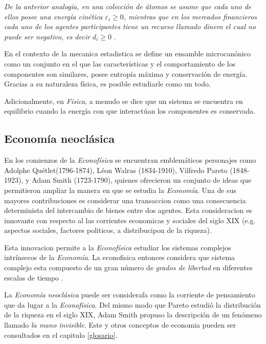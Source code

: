 \textit{De la anterior analogía, en una colección de átomos se asume que cada uno de ellos posee una energía cinética $\mathit{\varepsilon}_{i} \geqslant 0 $, mientras que en los mercados financieros cada uno de los agentes participantes tiene un recurso llamado dinero el cual no puede ser negativo, es decir  $\mathit{d}_{i} \geqslant 0 $} \citep[][pagina 149]{cottrell_classical_2009}.


En el contexto de la mecanica estadistica se define un ensamble microcanónico como un conjunto  en el que las características y el comportamiento de los componentes son similares, posee entropía máxima y conservación de energía. Gracias a su naturaleza física, es posible estudiarle como un todo.  

Adicionalmente, en \textit{Física}, a menudo se dice que un sistema se encuentra en equilibrio cuando la energía con que interactúan los componentes es conservada. 


\subsection{Economía neoclásica} 

En los comienzos de la \textit{Econofísica} se encuentran emblemáticos personajes como Adolphe Quétlet(1796-1874), Léon Walras (1834-1910), Vilfredo Pareto (1848-1923), y Adam Smith (1723-1790), quienes ofrecieron un conjunto de ideas que permitieron ampliar la manera en que se estudia la \textit{Economía}.
Una de sus mayores contribuciones es considerar una transaccion como una consecuencia determinista del intercambio de bienes entre dos agentes.
Esta consideracion es innovante con respecto al las corrientes economicas y sociales del siglo XIX (e.g. aspectos sociales,  factores politicos, a distribucipon de la riqueza). 

Esta innovacion permite a la \textit{Econofísica} estudiar los sistemas complejos intrínsecos de la \textit{Economía}. La econofisica entonces considera que sistema complejo esta compuesto de un gran número de \textit{grados de libertad} en diferentes escalas de tiempo  \citep[][pagina 17]{richmond}.

La \textit{Economía neoclásica} puede ser considerafa como la corriente de pensamiento que da lugar a la \textit{Econofísica}. Del mismo modo que Pareto estudió la distribución de la riqueza en el siglo XIX, Adam Smith propuso la descripción de un fenómeno llamado \textit{la mano invisible}. 
Este y otros conceptos de economia pueden ser consultados en el capitulo \ref{glosario}.

